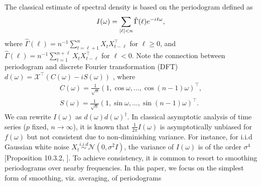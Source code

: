 The classical estimate of spectral density is based on the periodogram \citep{brockwell2013time, rosenblatt1985stationary} defined as
\begin{equation}
\label{eq:single_periodogram}
I(\omega)=\sum_{|\ell|<n} \hat{\Gamma}(\ell)e^{-{i\mkern1mu}\ell\omega},
\end{equation}
where $\hat{\Gamma}(\ell) = n^{-1}\sum_{t=\ell+1}^{n} X_t X_{t-\ell}^\top$ for $\ell\ge 0$, and 
 $\hat{\Gamma}(\ell) = n^{-1}\sum_{t=1}^{n+\ell} X_t X_{t-\ell}^\top$ for $\ell<0$. 
Note the connection between periodogram and discrete Fourier transformation (DFT)  $d(\omega) = \mathcal{X}^\top(C(\omega)-iS(\omega))$ , where 
\begin{equation}
\label{eq:cos_sin_coef}
\begin{aligned}
C(\omega) = \frac{1}{\sqrt{n}} (1, \cos \omega, \dots, \cos (n-1)\omega)^\top,\\
S(\omega) = \frac{1}{\sqrt{n}} (1, \sin \omega, \dots, \sin (n-1)\omega)^\top.
\end{aligned}
\end{equation}
We can rewrite $I(\omega)$ as $d(\omega) d(\omega)^\dag$. 
In classical asymptotic analysis of time series ($p$ fixed, $n \rightarrow \infty$), it is known that $\frac{1}{2\pi}I(\omega)$ is asymptotically unbiased for $f(\omega)$ but not consistent due to non-diminishing variance.
For instance, for i.i.d Gaussian white noise  
$X_t \overset{i.i.d}{\sim}\mathcal{N}(0,\sigma^2I)$, the variance of $I(\omega)$ is of the order $\sigma^4$ [Proposition 10.3.2,  \citet{brockwell2013time}].  To achieve consistency, it is common to resort to smoothing periodograms over nearby frequencies. In this paper, we focus on the simplest form of smoothing, viz. averaging, of periodograms 


